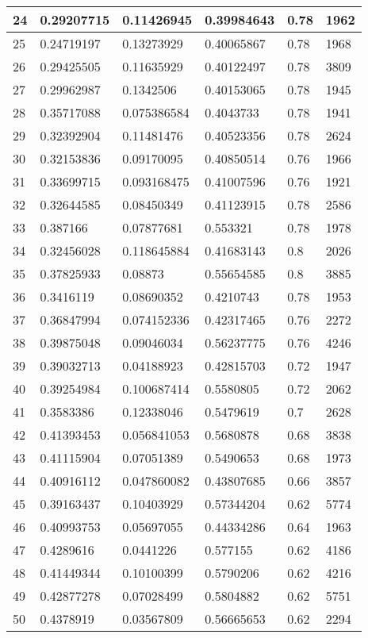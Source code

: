 \begin{longtable}{|l|l|l|l|l|l|}
24 & 0.29207715 & 0.11426945 & 0.39984643 & 0.78 & 1962 \\ \hline 
25 & 0.24719197 & 0.13273929 & 0.40065867 & 0.78 & 1968 \\ \hline 
26 & 0.29425505 & 0.11635929 & 0.40122497 & 0.78 & 3809 \\ \hline 
27 & 0.29962987 & 0.1342506 & 0.40153065 & 0.78 & 1945 \\ \hline 
28 & 0.35717088 & 0.075386584 & 0.4043733 & 0.78 & 1941 \\ \hline 
29 & 0.32392904 & 0.11481476 & 0.40523356 & 0.78 & 2624 \\ \hline 
30 & 0.32153836 & 0.09170095 & 0.40850514 & 0.76 & 1966 \\ \hline 
31 & 0.33699715 & 0.093168475 & 0.41007596 & 0.76 & 1921 \\ \hline 
32 & 0.32644585 & 0.08450349 & 0.41123915 & 0.78 & 2586 \\ \hline 
33 & 0.387166 & 0.07877681 & 0.553321 & 0.78 & 1978 \\ \hline 
34 & 0.32456028 & 0.118645884 & 0.41683143 & 0.8 & 2026 \\ \hline 
35 & 0.37825933 & 0.08873 & 0.55654585 & 0.8 & 3885 \\ \hline 
36 & 0.3416119 & 0.08690352 & 0.4210743 & 0.78 & 1953 \\ \hline 
37 & 0.36847994 & 0.074152336 & 0.42317465 & 0.76 & 2272 \\ \hline 
38 & 0.39875048 & 0.09046034 & 0.56237775 & 0.76 & 4246 \\ \hline 
39 & 0.39032713 & 0.04188923 & 0.42815703 & 0.72 & 1947 \\ \hline 
40 & 0.39254984 & 0.100687414 & 0.5580805 & 0.72 & 2062 \\ \hline 
41 & 0.3583386 & 0.12338046 & 0.5479619 & 0.7 & 2628 \\ \hline 
42 & 0.41393453 & 0.056841053 & 0.5680878 & 0.68 & 3838 \\ \hline 
43 & 0.41115904 & 0.07051389 & 0.5490653 & 0.68 & 1973 \\ \hline 
44 & 0.40916112 & 0.047860082 & 0.43807685 & 0.66 & 3857 \\ \hline 
45 & 0.39163437 & 0.10403929 & 0.57344204 & 0.62 & 5774 \\ \hline 
46 & 0.40993753 & 0.05697055 & 0.44334286 & 0.64 & 1963 \\ \hline 
47 & 0.4289616 & 0.0441226 & 0.577155 & 0.62 & 4186 \\ \hline 
48 & 0.41449344 & 0.10100399 & 0.5790206 & 0.62 & 4216 \\ \hline 
49 & 0.42877278 & 0.07028499 & 0.5804882 & 0.62 & 5751 \\ \hline 
50 & 0.4378919 & 0.03567809 & 0.56665653 & 0.62 & 2294 \\ \hline 
\end{longtable}